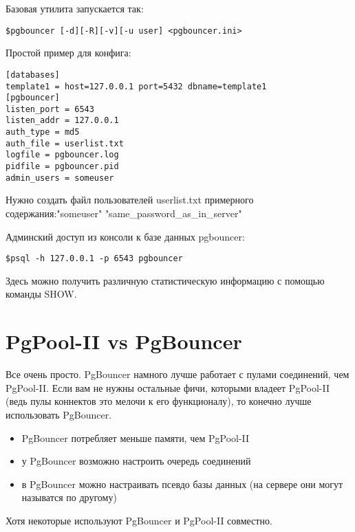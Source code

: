 Базовая утилита запускается так:
\begin{verbatim}
$pgbouncer [-d][-R][-v][-u user] <pgbouncer.ini>
\end{verbatim}

Простой пример для конфига:
\begin{verbatim}
[databases]
template1 = host=127.0.0.1 port=5432 dbname=template1
[pgbouncer]
listen_port = 6543
listen_addr = 127.0.0.1
auth_type = md5
auth_file = userlist.txt
logfile = pgbouncer.log
pidfile = pgbouncer.pid
admin_users = someuser
\end{verbatim}

Нужно создать файл пользователей userlist.txt примерного содержания:"someuser" "same\_password\_as\_in\_server"

Админский доступ из консоли к базе данных pgbouncer:
\begin{verbatim}
$psql -h 127.0.0.1 -p 6543 pgbouncer
\end{verbatim}

Здесь можно получить различную статистическую информацию с помощью команды SHOW.

\section{PgPool-II vs PgBouncer}

Все очень просто. PgBouncer намного лучше работает с пулами соединений, чем PgPool-II. Если вам не 
нужны остальные фичи, которыми владеет PgPool-II (ведь пулы коннектов это мелочи к его функционалу), 
то конечно лучше использовать PgBouncer. 
\begin{itemize}
\item PgBouncer потребляет меньше памяти, чем PgPool-II
\item у PgBouncer возможно настроить очередь соединений
\item в PgBouncer можно настраивать псевдо базы данных (на сервере они могут называтся по другому)
\end{itemize}

Хотя некоторые используют PgBouncer и PgPool-II совместно.